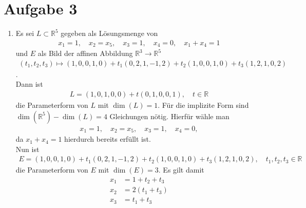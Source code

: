 \documentclass[11pt]{article}
\begin{document}
\section*{Aufgabe 3}
\begin{enumerate}[1)]
	\item Es sei $ L \subset \mathbb{R}^5 $ gegeben als Lösungsmenge von
	\begin{equation*}
	\begin{aligned}
	x_1 = 1, \quad x_2 = x_5, \quad x_3 = 1, \quad x_4 = 0, \quad x_1 + x_4 = 1
	\end{aligned}
	\end{equation*}
	und $ E $ als Bild der affinen Abbildung $ \mathbb{R}^3 \to \mathbb{R}^5 $
	\begin{equation*}
	\begin{aligned}
	(t_1,t_2,t_3) \mapsto (1,0,0,1,0) + t_1 (0,2,1,-1,2) + t_2(1,0,0,1,0) + t_3(1,2,1,0,2)
	\end{aligned}
	\end{equation*}.\\
	Dann ist
	\begin{equation*}
	\begin{aligned}
	L = (1,0,1,0,0) + t(0,1,0,0,1), \quad t \in \mathbb{R}
	\end{aligned}
	\end{equation*}
	die Parameterform von $ L $ mit $ \dim(L) = 1 $. Für die implizite Form sind $ \dim(\mathbb{R}^5) - \dim(L) = 4 $ Gleichungen nötig. Hierfür wähle man
	\begin{equation*}
	\begin{aligned}
	x_1 = 1, \quad x_2 = x_5, \quad x_3 = 1, \quad x_4 = 0,
	\end{aligned}
	\end{equation*}
	da $ x_1+x_4 = 1 $ hierdurch bereits erfüllt ist.\\
	Nun ist
	\begin{equation*}
	\begin{aligned}
	E = (1,0,0,1,0) + t_1 (0,2,1,-1,2) + t_2(1,0,0,1,0) + t_3(1,2,1,0,2), \quad t_1,t_2,t_3 \in \mathbb{R}
	\end{aligned}
	\end{equation*}
	die Parameterform von $ E $ mit $ \dim(E) = 3 $. Es gilt damit
	\begin{equation*}
	\begin{aligned}
	x_1 &= 1 + t_2 + t_3\\
	x_2 &= 2 (t_1 + t_3)\\
	x_3 &= t_1 + t_3\\

\end{aligned}
\end{equation*}
\end{enumerate}
\end{document}
